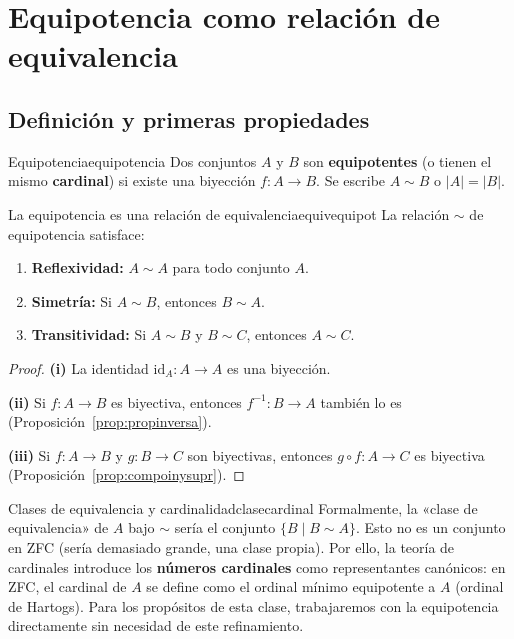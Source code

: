 \section{Equipotencia como relación de equivalencia}

\subsection{Definición y primeras propiedades}

\begin{definicion}{Equipotencia}{equipotencia}
Dos conjuntos $A$ y $B$ son \textbf{equipotentes} (o tienen el mismo \textbf{cardinal}) si existe una biyección $f: A \to B$. Se escribe $A \sim B$ o $|A| = |B|$.
\end{definicion}

\begin{teorema}{La equipotencia es una relación de equivalencia}{equivequipot}
La relación $\sim$ de equipotencia satisface:
\begin{enumerate}[leftmargin=2em, label=(\roman*)]
  \item \textbf{Reflexividad:} $A \sim A$ para todo conjunto $A$.
  \item \textbf{Simetría:} Si $A \sim B$, entonces $B \sim A$.
  \item \textbf{Transitividad:} Si $A \sim B$ y $B \sim C$, entonces $A \sim C$.
\end{enumerate}
\end{teorema}

\begin{proof}
\textbf{(i)} La identidad $\mathrm{id}_A: A \to A$ es una biyección.

\textbf{(ii)} Si $f: A \to B$ es biyectiva, entonces $f^{-1}: B \to A$ también lo es (Proposición~\ref{prop:propinversa}).

\textbf{(iii)} Si $f: A \to B$ y $g: B \to C$ son biyectivas, entonces $g \circ f: A \to C$ es biyectiva (Proposición~\ref{prop:compoinysupr}).
\end{proof}

\begin{observacion}{Clases de equivalencia y cardinalidad}{clasecardinal}
Formalmente, la «clase de equivalencia» de $A$ bajo $\sim$ sería el conjunto $\{B \mid B \sim A\}$. Esto no es un conjunto en ZFC (sería demasiado grande, una clase propia). Por ello, la teoría de cardinales introduce los \textbf{números cardinales} como representantes canónicos: en ZFC, el cardinal de $A$ se define como el ordinal mínimo equipotente a $A$ (ordinal de Hartogs). Para los propósitos de esta clase, trabajaremos con la equipotencia directamente sin necesidad de este refinamiento.
\end{observacion}

